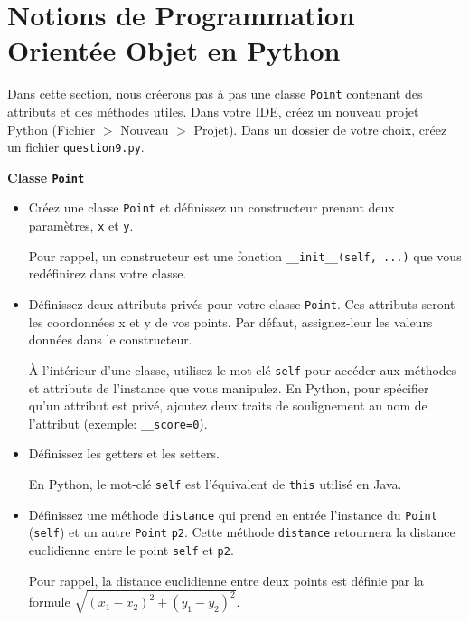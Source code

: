 \section{Notions de Programmation Orientée Objet en Python}
\label{sec:notions_python}
Dans cette section, nous créerons pas à pas une classe \lstinline{Point} contenant des attributs et des méthodes utiles.
Dans votre IDE, créez un nouveau projet Python (Fichier $>$ Nouveau $>$ Projet). Dans un dossier de votre choix, créez un fichier \lstinline{question9.py}.\\
\begin{Exercice}[15 minutes] \textbf{Classe \texttt{Point}}
    \begin{itemize}
        \item Créez une classe \lstinline{Point} et définissez un constructeur prenant deux paramètres, \lstinline{x} et \lstinline{y}.
        \begin{conseil}
            Pour rappel, un constructeur est une fonction \lstinline{__init__(self, ...)} que vous redéfinirez dans votre classe.
        \end{conseil}
        \item Définissez deux attributs privés pour votre classe \lstinline{Point}. Ces attributs seront les coordonnées x et y de vos points. Par défaut, assignez-leur les valeurs données dans le constructeur.
        \begin{conseil}
            À l'intérieur d'une classe, utilisez le mot-clé \lstinline{self} pour accéder aux méthodes et attributs de l'instance que vous manipulez.
            En Python, pour spécifier qu'un attribut est privé, ajoutez deux traits de soulignement au nom de l'attribut (exemple: \lstinline{__score=0}).
        \end{conseil}
        \item Définissez les getters et les setters.
        \begin{conseil}
            En Python, le mot-clé \lstinline{self} est l'équivalent de \lstinline{this} utilisé en Java.
        \end{conseil}
        \item Définissez une méthode \lstinline{distance} qui prend en entrée l'instance du \lstinline{Point} (\lstinline{self}) et un autre \lstinline{Point} \lstinline{p2}. Cette méthode \lstinline{distance} retournera la distance euclidienne entre le point \lstinline{self} et \lstinline{p2}. 
        \begin{conseil}
            Pour rappel, la distance euclidienne entre deux points est définie par la formule $\sqrt{(x_1 - x_2)^2 + (y_1 - y_2)^2}$.

\end{conseil}
\end{itemize}
\end{Exercice}
